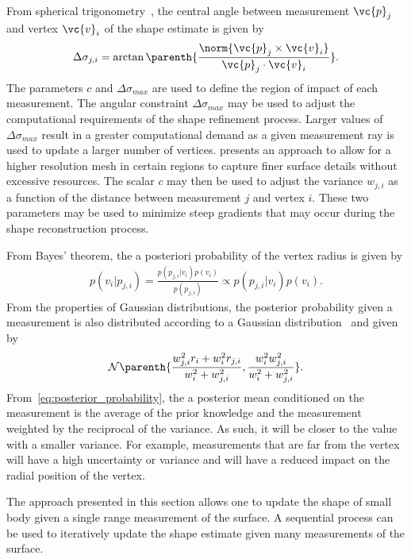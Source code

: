\documentclass[smallextended]{svjour3}       %
\begin{document}
From spherical trigonometry~\cite{gade2010}, the central angle between measurement \( \vc{p}_j \) and vertex \( \vc{v}_i \) of the shape estimate is given by
\begin{align}\label{eq:geodesic_distance}
    \Delta \sigma_{j,i} = \arctan \parenth{\frac{\norm{\vc{p}_j \times \vc{v}_i}}{\vc{p}_j \cdot \vc{v}_i }}.
\end{align}
The parameters \( c \) and \( \Delta \sigma_{max} \) are used to define the region of impact of each measurement. 
The angular constraint \( \Delta \sigma_{max} \) may be used to adjust the computational requirements of the shape refinement process.
Larger values of \( \Delta \sigma_{max} \) result in a greater computational demand as a given measurement ray is used to update a larger number of vertices.
 presents an approach to allow for a higher resolution mesh in certain regions to capture finer surface details without excessive resources. 
The scalar \( c \) may then be used to adjust the variance \( w_{j,i} \) as a function of the distance between measurement \( j \) and vertex \( i \).
These two parameters may be used to minimize steep gradients that may occur during the shape reconstruction process.

From Bayes' theorem, the a posteriori probability of the vertex radius is given by
\begin{align}
    p(v_i | p_{j, i}) = \frac{p(p_{j, i} | v_i) p(v_i)}{p( p_{j, i})} \propto p(p_{j,i} | v_i) p(v_i).
\end{align}
From the properties of Gaussian distributions, the posterior probability given a measurement is also distributed according to a Gaussian distribution~\cite{bishop2006} and given by
\begin{align}\label{eq:posterior_probability}
    \mathcal{N} \parenth{\frac{w_{j, i}^2 r_i + w_i^2 r_{j, i}}{w_i^2 + w_{j, i}^2} , \frac{w_i^2  w_{j, i}^2}{w_i^2 +  w_{j, i}^2}} .
\end{align}
From~\cref{eq:posterior_probability}, the a posterior mean conditioned on the measurement is the average of the prior knowledge and the measurement weighted by the reciprocal of the variance. 
As such, it will be closer to the value with a smaller variance. 
For example, measurements that are far from the vertex will have a high uncertainty or variance and will have a reduced impact on the radial position of the vertex.

The approach presented in this section allows one to update the shape of small body given a single range measurement of the surface.
A sequential process can be used to iteratively update the shape estimate given many measurements of the surface. 
\end{document}
